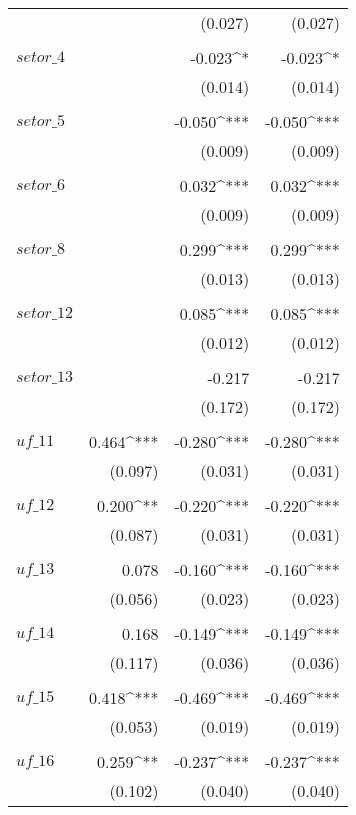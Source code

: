 \begin{apendicesenv}
\begin{footnotesize}
\begin{longtable}{@{\extracolsep{5pt}}lD{.}{.}{-3} D{.}{.}{-3} D{.}{.}{-3} }
	  &  & (0.027) & (0.027) \\ 
	  & & & \\ 
	 $setor\_4$ &  & -0.023^{*} & -0.023^{*} \\ 
	  &  & (0.014) & (0.014) \\
	  & & & \\
	 $setor\_5$ &  & -0.050^{***} & -0.050^{***} \\
	  &  & (0.009) & (0.009) \\
	  & & & \\ 
	 $setor\_6$ &  & 0.032^{***} & 0.032^{***} \\
	  &  & (0.009) & (0.009) \\
	  & & & \\
	 $setor\_8$ &  & 0.299^{***} & 0.299^{***} \\
	  &  & (0.013) & (0.013) \\
	  & & & \\
	 $setor\_12$ &  & 0.085^{***} & 0.085^{***} \\ 
	  &  & (0.012) & (0.012) \\
	  & & & \\
	 $setor\_13$ &  & -0.217 & -0.217 \\
	  &  & (0.172) & (0.172) \\
	  & & & \\
	 $uf\_11$ & 0.464^{***} & -0.280^{***} & -0.280^{***} \\
	  & (0.097) & (0.031) & (0.031) \\
	  & & & \\
	 $uf\_12$ & 0.200^{**} & -0.220^{***} & -0.220^{***} \\
	  & (0.087) & (0.031) & (0.031) \\
	  & & & \\ 
	 $uf\_13$ & 0.078 & -0.160^{***} & -0.160^{***} \\
	  & (0.056) & (0.023) & (0.023) \\
	  & & & \\
	 $uf\_14$ & 0.168 & -0.149^{***} & -0.149^{***} \\
	  & (0.117) & (0.036) & (0.036) \\
	  & & & \\
	 $uf\_15$ & 0.418^{***} & -0.469^{***} & -0.469^{***} \\
	  & (0.053) & (0.019) & (0.019) \\
	  & & & \\ 
	 $uf\_16$ & 0.259^{**} & -0.237^{***} & -0.237^{***} \\
	  & (0.102) & (0.040) & (0.040) \\

\end{longtable}
\end{footnotesize}
\end{apendicesenv}
